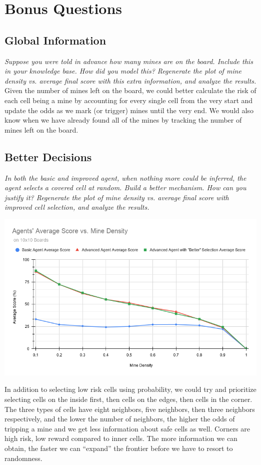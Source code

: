 \documentclass[11pt]{article} %
\begin{document}
\section{\textbf{Bonus Questions}}

\subsection{Global Information}

\textit{Suppose you were told in advance how many mines are on the board. Include this in your knowledge base. How did you model this? Regenerate the plot of mine density vs. average final score with this extra information, and analyze the results.}\\

Given the number of mines left on the board, we could better calculate the risk of each cell being a mine by accounting for every single cell from the very start and update the odds as we mark (or trigger) mines until the very end. We would also know when we have already found all of the mines by tracking the number of mines left on the board.

\subsection{Better Decisions}

\textit{In both the basic and improved agent, when nothing more could be inferred, the agent selects a covered cell at random. Build a better mechanism. How can you justify it? Regenerate the plot of mine density vs. average final score with improved cell selection, and analyze the results.}\\

\begin{center}
\includegraphics*[scale=0.5]{plot2.png}\\
\end{center}

In addition to selecting low risk cells using probability, we could try and prioritize selecting cells on the inside first, then cells on the edges, then cells in the corner. The three types of cells have eight neighbors, five neighbors, then three neighbors respectively, and the lower the number of neighbors, the higher the odds of tripping a mine and we get less information about safe cells as well. Corners are high risk, low reward compared to inner cells. The more information we can obtain, the faster we can “expand” the frontier before we have to resort to randomness.
\end{document}
